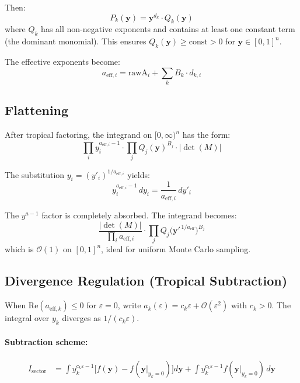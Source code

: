 \documentclass[11pt,a4paper]{article}
\begin{document}
Then:
\begin{equation}
P_k(\mathbf{y}) = \mathbf{y}^{d_k} \cdot Q_k(\mathbf{y})
\end{equation}
where $Q_k$ has all non-negative exponents and contains at least one constant term (the dominant monomial). This ensures $Q_k(\mathbf{y}) \geq \text{const} > 0$ for $\mathbf{y} \in [0,1]^n$.

The effective exponents become:
\begin{equation}
a_{\mathrm{eff},i} = \mathrm{rawA}_i + \sum_k B_k \cdot d_{k,i}
\end{equation}

\subsection{Flattening}

After tropical factoring, the integrand on $[0,\infty)^n$ has the form:
\begin{equation}
\prod_i y_i^{a_{\mathrm{eff},i} - 1} \cdot \prod_j Q_j(\mathbf{y})^{B_j} \cdot |\det(M)|
\end{equation}

The substitution $y_i = (y'_i)^{1/a_{\mathrm{eff},i}}$ yields:
\begin{equation}
y_i^{a_{\mathrm{eff},i} - 1} \, dy_i = \frac{1}{a_{\mathrm{eff},i}} \, dy'_i
\end{equation}

The $y^{a-1}$ factor is completely absorbed. The integrand becomes:
\begin{equation}
\frac{|\det(M)|}{\prod_i a_{\mathrm{eff},i}} \cdot \prod_j Q_j\!\bigl(\mathbf{y}'^{\,1/a_{\mathrm{eff}}}\bigr)^{B_j}
\end{equation}
which is $\mathcal{O}(1)$ on $[0,1]^n$, ideal for uniform Monte Carlo sampling.

\subsection{Divergence Regulation (Tropical Subtraction)}

When $\mathrm{Re}(a_{\mathrm{eff},k}) \leq 0$ for $\varepsilon = 0$, write $a_k(\varepsilon) = c_k \varepsilon + \mathcal{O}(\varepsilon^2)$ with $c_k > 0$. The integral over $y_k$ diverges as $1/(c_k \varepsilon)$.

\paragraph{Subtraction scheme:}
\begin{align}
I_{\mathrm{sector}} &= \int y_k^{c_k\varepsilon - 1} \bigl[f(\mathbf{y}) - f(\mathbf{y}|_{y_k=0})\bigr] d\mathbf{y} + \int y_k^{c_k\varepsilon - 1} f(\mathbf{y}|_{y_k=0}) \, d\mathbf{y}
\end{align}
\end{document}

